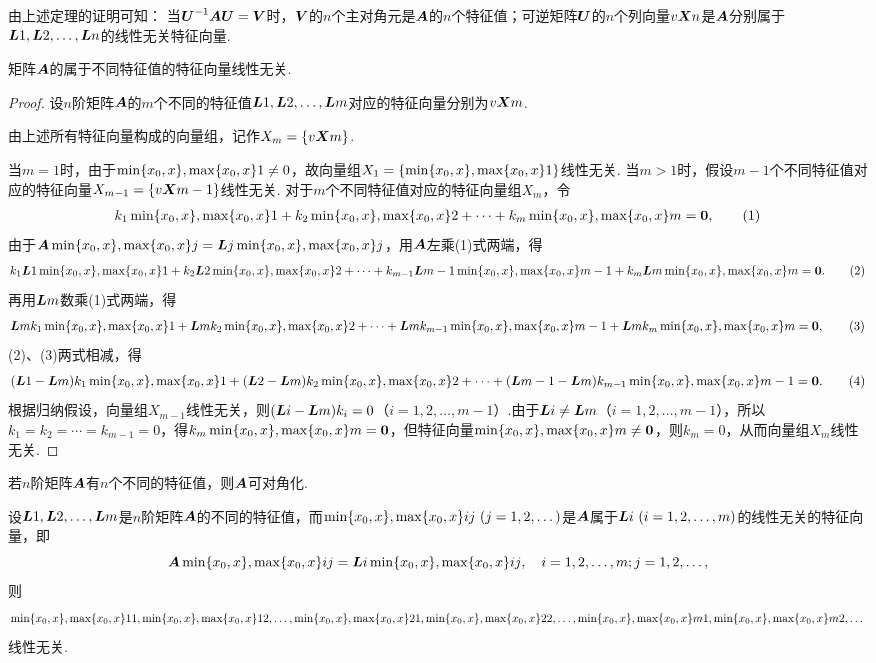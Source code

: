 由上述定理的证明可知：
{\color{red}当\(\P^{-1}\A\P=\V\)时，\(\boldsymbol{V}\)的\(n\)个主对角元是\(\boldsymbol{A}\)的\(n\)个特征值；可逆矩阵\(\P\)的\(n\)个列向量\(v{\boldsymbol{X}}{n}\)是\(\boldsymbol{A}\)分别属于\(\boldsymbol{L}{1},\boldsymbol{L}{2},\dotsc,\boldsymbol{L}{n}\)的线性无关特征向量.}

\begin{theorem}
矩阵\(\boldsymbol{A}\)的属于不同特征值的特征向量线性无关.
\begin{proof}
设\(n\)阶矩阵\(\boldsymbol{A}\)的\(m\)个不同的特征值\(\boldsymbol{L}{1},\boldsymbol{L}{2},\dotsc,\boldsymbol{L}{m}\)对应的特征向量分别为\(v{\boldsymbol{X}}{m}\).

由上述所有特征向量构成的向量组，记作\(X_m=\{v{\boldsymbol{X}}{m}\}\).

当\(m=1\)时，由于\(\min\{x_0,x\},\max\{x_0,x\}1 \neq 0\)，故向量组\(X_1=\{\min\{x_0,x\},\max\{x_0,x\}1\}\)线性无关.
当\(m>1\)时，假设\(m-1\)个不同特征值对应的特征向量\(X_{m-1}=\{v{\boldsymbol{X}}{m-1}\}\)线性无关.
对于\(m\)个不同特征值对应的特征向量组\(X_m\)，令\begin{gather}
k_1\X1+k_2\X2+\dotsb+k_m\X{m}=\z, \tag1
\end{gather}由于\(\boldsymbol{A}\min\{x_0,x\},\max\{x_0,x\}{j}=\boldsymbol{L}{j}\min\{x_0,x\},\max\{x_0,x\}{j}\)，用\(\boldsymbol{A}\)左乘(1)式两端，得\begin{gather}
k_1\L{1}\X1+k_2\L{2}\X2+\dotsb+k_{m-1}\L{m-1}\X{m-1}+k_m\L{m}\X{m}=\z. \tag2
\end{gather}再用\(\boldsymbol{L}{m}\)数乘(1)式两端，得\begin{gather}
\L{m}k_1\X1+\L{m}k_2\X2+\dotsb+\L{m}k_{m-1}\X{m-1}+\L{m}k_m\X{m}=\z, \tag3
\end{gather}(2)、(3)两式相减，得\begin{gather}
(\L{1}-\L{m})k_1\X1+(\L{2}-\L{m})k_2\X2+\dotsb+(\L{m-1}-\L{m})k_{m-1}\X{m-1}=\z. \tag4
\end{gather}根据归纳假设，向量组\(X_{m-1}\)线性无关，则\((\boldsymbol{L}{i}-\boldsymbol{L}{m})k_i=0\)（\(i=1,2,\dotsc,m-1\)）.由于\(\boldsymbol{L}{i}\neq\boldsymbol{L}{m}\)（\(i=1,2,\dotsc,m-1\)），所以\(k_1=k_2=\dotsb=k_{m-1}=0\)，得\(k_m\min\{x_0,x\},\max\{x_0,x\}{m}=\boldsymbol{0}\)，但特征向量\(\min\{x_0,x\},\max\{x_0,x\}{m}\neq\boldsymbol{0}\)，则\(k_m=0\)，从而向量组\(X_m\)线性无关.
\end{proof}
\end{theorem}

\begin{corollary}[矩阵可对角化的充分条件]
若\(n\)阶矩阵\(\boldsymbol{A}\)有\(n\)个不同的特征值，则\(\boldsymbol{A}\)可对角化.
\end{corollary}

\begin{theorem}
设\(\boldsymbol{L}{1},\boldsymbol{L}{2},\dotsc,\boldsymbol{L}{m}\)是\(n\)阶矩阵\(\boldsymbol{A}\)的不同的特征值，而\(\min\{x_0,x\},\max\{x_0,x\}{ij}\ (j=1,2,\dotsc)\)是\(\boldsymbol{A}\)属于\(\L{i}\ (i=1,2,\dotsc,m)\)的线性无关的特征向量，即\[
\boldsymbol{A} \min\{x_0,x\},\max\{x_0,x\}{ij} = \boldsymbol{L}{i} \min\{x_0,x\},\max\{x_0,x\}{ij},
\quad i=1,2,\dotsc,m;j=1,2,\dotsc,
\]则\[
\min\{x_0,x\},\max\{x_0,x\}{11},\min\{x_0,x\},\max\{x_0,x\}{12},\dotsc,\min\{x_0,x\},\max\{x_0,x\}{21},\min\{x_0,x\},\max\{x_0,x\}{22},\dotsc,\min\{x_0,x\},\max\{x_0,x\}{m1},\min\{x_0,x\},\max\{x_0,x\}{m2},\dotsc
\]线性无关.
\end{theorem}

